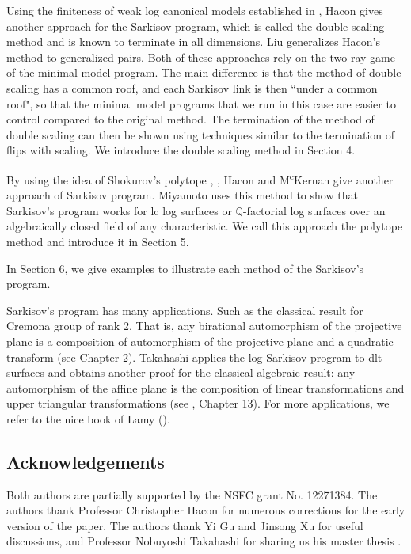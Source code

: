 \documentclass[11pt]{amsart}
\begin{document}
Using the finiteness of weak log canonical models established in \cite{BCHM10}, Hacon \cite{haconMinimalModelProgram2012} gives another approach for the Sarkisov program, which is called the double scaling method and is known to  terminate in all dimensions. 
Liu \cite{liuSarkisovProgramGeneralized2021} generalizes Hacon's method to generalized pairs.
Both of these approaches rely on the two ray game of the minimal model program. The main difference is that the method of double 
scaling has a common roof, and each Sarkisov link is then ``under a common roof", so that the minimal model programs that we run in this case are easier to control compared to  the original method.
The termination of the method of double scaling can then be shown using techniques similar to the termination of flips with scaling. We introduce the double scaling method in Section 4. 






By using the idea of Shokurov's polytope \cite{Sho96}, \cite{cs11}, Hacon and M\textsuperscript{c}Kernan \cite{haconSarkisovProgram2012} give another approach of Sarkisov program. Miyamoto \cite{miyamoto2019TheSP} uses this method to show that Sarkisov's program works for  lc log surfaces or $\mathbb{Q}$-factorial log surfaces over an algebraically closed  field of any characteristic.  We call this approach the polytope method and introduce it in Section 5.

In Section 6, we give examples to illustrate each method of the Sarkisov's program.

Sarkisov's program has many applications. Such as the classical result for Cremona group of rank 2. That is, any birational automorphism of the projective plane is a composition of automorphism of the projective plane and a quadratic transform (see \cite{ksc04} Chapter 2). Takahashi \cite{tak95} applies the log Sarkisov program to dlt surfaces and obtains another proof for the classical algebraic result: any automorphism of the affine plane is the composition of linear transformations and upper triangular transformations (see \cite{mat02}, Chapter 13). For more applications, we refer to the nice book of Lamy (\cite{lam22}). 

\subsection*{Acknowledgements} Both authors are partially supported by the NSFC grant No. 12271384.
The authors thank Professor Christopher Hacon for numerous corrections for the early version of the paper. The authors thank Yi Gu and Jinsong Xu for useful discussions, and Professor Nobuyoshi Takahashi for sharing us his master thesis \cite{tak95}.
\end{document}
